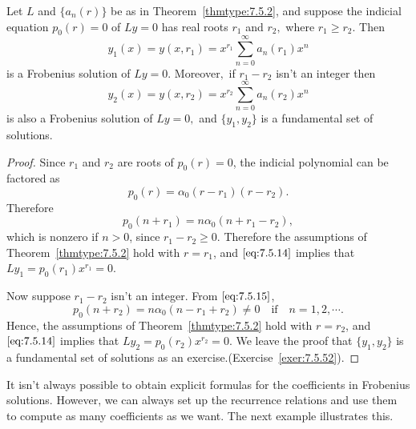 \documentclass{ximera}
\begin{document}
\begin{theorem}\label{thmtype:7.5.3}
Let $L$ and $\{a_n(r)\}$ be as in Theorem~\ref{thmtype:7.5.2}, and suppose the
indicial equation $p_0(r)=0$ of $Ly=0$ has real roots $r_1$ and $r_2,$
where $r_1\geq r_2.$ Then
$$
y_1(x)=y(x,r_1)=x^{r_1}\sum_{n=0}^\infty a_n(r_1)x^n
$$
is a Frobenius solution of $Ly=0$. Moreover$,$ if $r_1-r_2$ isn't  an
integer then
$$
y_2(x)=y(x,r_2)=x^{r_2}\sum_{n=0}^\infty a_n(r_2)x^n
$$
is also a Frobenius solution of $Ly=0,$
and $\{y_1,y_2\}$ is a fundamental set of solutions.
\end{theorem}

\begin{proof}
Since $r_1$ and $r_2$ are roots of $p_0(r)=0$, the indicial polynomial
can be factored as
\begin{equation} \label{eq:7.5.15}
p_0(r)=\alpha_0(r-r_1)(r-r_2).
\end{equation}
Therefore
$$
p_0(n+r_1)=n\alpha_0(n+r_1-r_2),
$$
which is nonzero if $n>0$, since $r_1-r_2\geq0$. Therefore the
assumptions of Theorem~\ref{thmtype:7.5.2} hold with $r=r_1$, and
$\eqref{eq:7.5.14}$ implies that $Ly_1=p_0(r_1)x^{r_1}=0$.

Now suppose $r_1-r_2$ isn't  an integer. From $\eqref{eq:7.5.15}$,
$$
p_0(n+r_2)=n\alpha_0(n-r_1+r_2)\neq 0\quad\mbox{if}\quad n=1,2,\cdots.
$$
Hence, the assumptions of Theorem~\ref{thmtype:7.5.2} hold with $r=r_2$,
and $\eqref{eq:7.5.14}$ implies that $Ly_2=p_0(r_2)x^{r_2}=0$. We leave the
proof that $\{y_1,y_2\}$ is a fundamental set of solutions as an
exercise.(Exercise~\ref{exer:7.5.52}). \bbox
\end{proof}

It isn't  always possible to obtain explicit formulas for the
coefficients in Frobenius solutions. However, we can always set up the
recurrence relations and use them to compute as many coefficients as we
want. The next example illustrates this.
\end{document}
